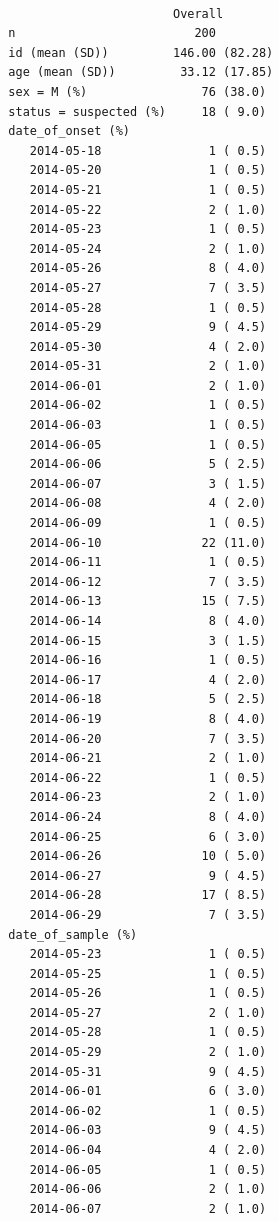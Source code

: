 \documentclass[
  letterpaper,
  DIV=11,
  numbers=noendperiod]{scrreprt}
\begin{document}
\begin{verbatim}
                        
                         Overall       
  n                         200        
  id (mean (SD))         146.00 (82.28)
  age (mean (SD))         33.12 (17.85)
  sex = M (%)                76 (38.0) 
  status = suspected (%)     18 ( 9.0) 
  date_of_onset (%)                    
     2014-05-18               1 ( 0.5) 
     2014-05-20               1 ( 0.5) 
     2014-05-21               1 ( 0.5) 
     2014-05-22               2 ( 1.0) 
     2014-05-23               1 ( 0.5) 
     2014-05-24               2 ( 1.0) 
     2014-05-26               8 ( 4.0) 
     2014-05-27               7 ( 3.5) 
     2014-05-28               1 ( 0.5) 
     2014-05-29               9 ( 4.5) 
     2014-05-30               4 ( 2.0) 
     2014-05-31               2 ( 1.0) 
     2014-06-01               2 ( 1.0) 
     2014-06-02               1 ( 0.5) 
     2014-06-03               1 ( 0.5) 
     2014-06-05               1 ( 0.5) 
     2014-06-06               5 ( 2.5) 
     2014-06-07               3 ( 1.5) 
     2014-06-08               4 ( 2.0) 
     2014-06-09               1 ( 0.5) 
     2014-06-10              22 (11.0) 
     2014-06-11               1 ( 0.5) 
     2014-06-12               7 ( 3.5) 
     2014-06-13              15 ( 7.5) 
     2014-06-14               8 ( 4.0) 
     2014-06-15               3 ( 1.5) 
     2014-06-16               1 ( 0.5) 
     2014-06-17               4 ( 2.0) 
     2014-06-18               5 ( 2.5) 
     2014-06-19               8 ( 4.0) 
     2014-06-20               7 ( 3.5) 
     2014-06-21               2 ( 1.0) 
     2014-06-22               1 ( 0.5) 
     2014-06-23               2 ( 1.0) 
     2014-06-24               8 ( 4.0) 
     2014-06-25               6 ( 3.0) 
     2014-06-26              10 ( 5.0) 
     2014-06-27               9 ( 4.5) 
     2014-06-28              17 ( 8.5) 
     2014-06-29               7 ( 3.5) 
  date_of_sample (%)                   
     2014-05-23               1 ( 0.5) 
     2014-05-25               1 ( 0.5) 
     2014-05-26               1 ( 0.5) 
     2014-05-27               2 ( 1.0) 
     2014-05-28               1 ( 0.5) 
     2014-05-29               2 ( 1.0) 
     2014-05-31               9 ( 4.5) 
     2014-06-01               6 ( 3.0) 
     2014-06-02               1 ( 0.5) 
     2014-06-03               9 ( 4.5) 
     2014-06-04               4 ( 2.0) 
     2014-06-05               1 ( 0.5) 
     2014-06-06               2 ( 1.0) 
     2014-06-07               2 ( 1.0) 

\end{verbatim}
\end{document}
